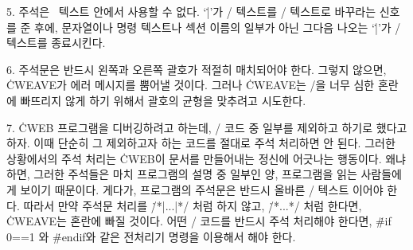 5. 주석은 \pb\ 텍스트 안에서 사용할 수 없다. `\.|'가 \TEX/ 텍스트를 \CEE/ 텍스트로
바꾸라는 신호를 준 후에, 문자열이나 명령 텍스트나 섹션 이름의 일부가 아닌 그다음 나오는
`\.|'가 \CEE/ 텍스트를 종료시킨다.

6. 주석문은 반드시 왼쪽과 오른쪽 괄호가 적절히 매치되어야 한다. 그렇지 않으면, \.{CWEAVE}가
에러 메시지를 뿜어낼 것이다. 그러나 \.{CWEAVE}는 \TEX/을 너무 심한 혼란에 빠뜨리지 않게
하기 위해서 괄호의 균형을 맞추려고 시도한다.

7. \.{CWEB} 프로그램을 디버깅하려고 하는데, \CEE/ 코드 중 일부를 제외하고 하기로 했다고
하자. 이때 단순히 그 제외하고자 하는 코드를 절대로 주석 처리하면 안 된다. 그러한 상황에서의
주석 처리는 \.{CWEB}이 문서를 만들어내는 정신에 어긋나는 행동이다. 왜냐하면, 그러한 주석들은
마치 프로그램의 설명 중 일부인 양, 프로그램을 읽는 사람들에게 보이기 때문이다. 게다가,
프로그램의 주석문은 반드시 올바른 \TEX/ 텍스트 이어야 한다. 따라서 만약 주석문 처리를
\.{/*|...|*/} 처럼 하지 않고, \.{/*...*/} 처럼 한다면, \.{CWEAVE}는 혼란에 빠질
것이다. 어떤 \CEE/ 코드를 반드시 주석 처리해야 한다면, \.{\#if 0==1} 와 \.{\#endif}와
같은 전처리기 명령을 이용해서 해야 한다.

